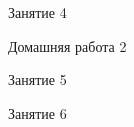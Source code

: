 \begin{class}[number=4]
	\begin{listofex}
		\item Занятие 4
	\end{listofex}
\end{class}

\begin{homework}[number=2]
	\begin{listofex}
		\item Домашняя работа 2
	\end{listofex}
\end{homework}

\begin{class}[number=5]
	\begin{listofex}
		\item Занятие 5
	\end{listofex}
\end{class}

\begin{class}[number=6]
	\begin{listofex}
		\item Занятие 6
	\end{listofex}
\end{class}


